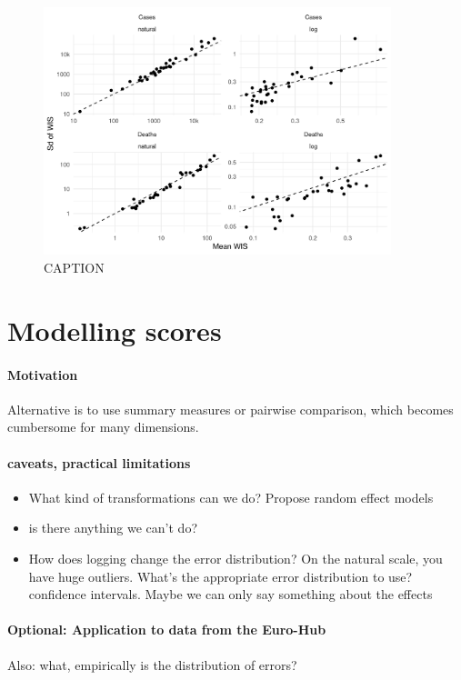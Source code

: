 \documentclass{article}
\begin{document}
\begin{figure}[h!]
    \centering
    \includegraphics[width=0.9\textwidth]{output/figures/HUB-sd-vs-mean-scores.png}
    \caption{CAPTION}
    \label{fig:HUB-mean-sd-scores}
\end{figure}


\section{Modelling scores}
\paragraph{Motivation} Alternative is to use summary measures or pairwise comparison, which becomes cumbersome for many dimensions. 

\paragraph{caveats, practical limitations}
\begin{itemize}
    \item What kind of transformations can we do? Propose random effect models
    \item is there anything we can't do? 
    \item How does logging change the error distribution? On the natural scale, you have huge outliers. What's the appropriate error distribution to use? confidence intervals. Maybe we can only say something about the effects
\end{itemize}


\paragraph{Optional: Application to data from the Euro-Hub}
Also: what, empirically is the distribution of errors? 
\end{document}
